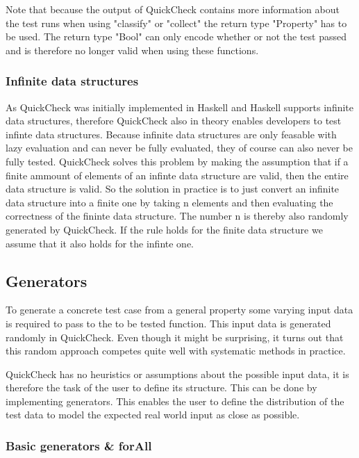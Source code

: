 \documentclass[a4paper, 12pt]{article} %
\begin{document}
Note that because the output of QuickCheck contains more information about the test runs when using "classify" or "collect" the return type "Property" has to be used. The return type "Bool" can only encode whether or not the test passed and is therefore no longer valid when using these functions. 

\subsubsection{Infinite data structures}

As QuickCheck was initially implemented in Haskell and Haskell supports infinite data structures, therefore QuickCheck also in theory enables developers to test infinte data structures. Because infinite data structures are only feasable with lazy evaluation and can never be fully evaluated, they of course can also never be fully tested. QuickCheck solves this problem by making the assumption that if a finite ammount of elements of an infinte data structure are valid, then the entire data structure is valid. So the solution in practice is to just convert an infinite data structure into a finite one by taking n elements and then evaluating the correctness of the fininte data structure. The number n is thereby also randomly generated by QuickCheck. If the rule holds for the finite data structure we assume that it also holds for the infinte one. \cite{Claessen2000}

\subsection{Generators}

To generate a concrete test case from a general property some varying input data is required to pass to the to be tested function. This input data is generated randomly in QuickCheck. Even though it might be surprising, it turns out that this random approach competes quite well with systematic methods in practice. \cite{Claessen2000}

QuickCheck has no heuristics or assumptions about the possible input data, it is therefore the task of the user to define its structure. This can be done by implementing generators. This enables the user to define the distribution of the test data to model the expected real world input as close as possible.


\subsubsection{Basic generators \& forAll}
\end{document}
